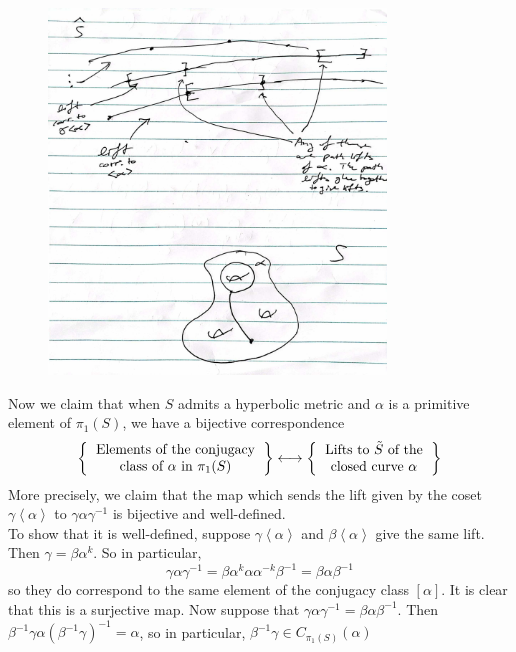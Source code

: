 \documentclass[reqno]{amsart}
\theoremstyle{definition}
\theoremstyle{remark}
\begin{document}
 \begin{figure}[http]
     \centering
     \includegraphics[width=0.8\textwidth]{lifts-of-paths.jpg}
     \caption{}
     \label{fig:lifts-of-paths}
 \end{figure}

Now we claim that when $S$ admits a hyperbolic metric and
$\alpha$ is a primitive element of $\pi_1 (S)$, we have
a bijective correspondence
\[
\left\{ 
    \begin{tabular}{c}
    Elements of the conjugacy\\
    class of $\alpha$ in $\pi_1 (S)$
\end{tabular}
\right\} 
\longleftrightarrow
\left\{ 
    \begin{tabular}{c}
    Lifts to $\tilde{S}$ of the\\
    closed curve $\alpha$
\end{tabular}
\right\} 
\] 
More precisely, we claim that the map which sends the lift
given by the coset $\gamma \left<\alpha \right>$ to
$\gamma \alpha \gamma^{-1}$ is bijective and well-defined.\\
To show that it is well-defined, suppose $\gamma \left<\alpha \right>$ and
$\beta \left<\alpha \right>$ give the same lift. Then
$\gamma = \beta \alpha^k$. So in particular,
\[
    \gamma \alpha \gamma^{-1} = \beta \alpha^k \alpha \alpha^{-k} \beta^{-1}
    = \beta \alpha \beta^{-1}
\] 
so they do correspond to the same element of the conjugacy class
$\left[ \alpha \right] $. It is clear that this is a surjective map.
Now suppose that $\gamma \alpha \gamma^{-1} = \beta \alpha \beta^{-1}$. 
Then $\beta^{-1} \gamma \alpha \left( \beta^{-1} \gamma \right)^{-1} =
\alpha$, so in particular, $\beta^{-1} \gamma \in C_{\pi_1(S)}(\alpha)$





 






\end{document}
